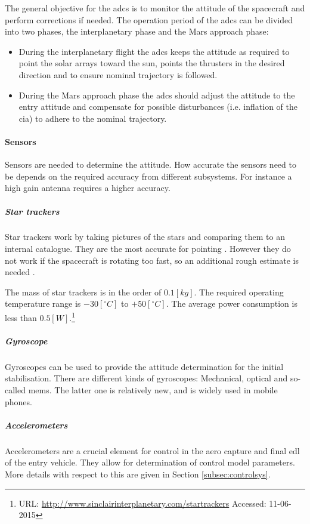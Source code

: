 The general objective for the \gls{adcs} is to monitor the attitude of the spacecraft and perform corrections if needed. The operation period of the \gls{adcs} can be divided into two phases, the interplanetary phase and the Mars approach phase:
\begin{itemize}
\item During the interplanetary flight the \gls{adcs} keeps the attitude as required to point the solar arrays toward the sun, points the thrusters in the desired direction and to ensure nominal trajectory is followed.

\item During the Mars approach phase the \gls{adcs} should adjust the attitude to the entry attitude and compensate for possible disturbances (i.e. inflation of the \gls{cia}) to adhere to the nominal trajectory.
\end{itemize}
\paragraph{Sensors} Sensors are needed to determine the attitude. How accurate the sensors need to be depends on the required accuracy from different subsystems. For instance a high gain antenna requires a higher accuracy. 

\subparagraph{Star trackers}
Star trackers work by taking pictures of the stars and comparing them to an internal catalogue. They are the most accurate for pointing \cite{CarlChristianLiebe1995}. However they do not work if the spacecraft is rotating too fast, so an additional rough estimate is needed \cite[p. 584]{Wertz2011}. 

The mass of star trackers is in the order of $0.1 \left[kg\right]$. The required operating temperature range is $-30 \left[^\circ C\right]$ to $+50 \left[^\circ C\right]$. The average power consumption is less than $0.5 \left[W\right]$.\footnote{URL: \url{http://www.sinclairinterplanetary.com/startrackers} Accessed: 11-06-2015}

\subparagraph{Gyroscope}                        
Gyroscopes can be used to provide the attitude determination for the initial stabilisation. There are different kinds of gyroscopes: Mechanical, optical and so-called \gls{mems}. The latter one is relatively new, and is widely used in mobile phones. 

\subparagraph{Accelerometers}                        
Accelerometers are a crucial element for control in the aero capture and final \gls{edl} of the entry vehicle. They allow for determination of control model parameters. More details with respect to this are given in Section \ref{subsec:controlsys}.

